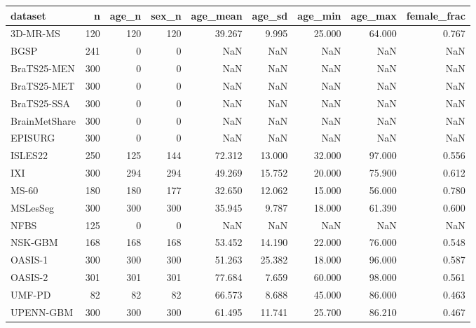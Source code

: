 \begin{tabular}{lrrrrrrrr}
\toprule
dataset & n & age\_n & sex\_n & age\_mean & age\_sd & age\_min & age\_max & female\_frac \\
\midrule
3D-MR-MS & 120 & 120 & 120 & 39.267 & 9.995 & 25.000 & 64.000 & 0.767 \\
BGSP & 241 & 0 & 0 & NaN & NaN & NaN & NaN & NaN \\
BraTS25-MEN & 300 & 0 & 0 & NaN & NaN & NaN & NaN & NaN \\
BraTS25-MET & 300 & 0 & 0 & NaN & NaN & NaN & NaN & NaN \\
BraTS25-SSA & 300 & 0 & 0 & NaN & NaN & NaN & NaN & NaN \\
BrainMetShare & 300 & 0 & 0 & NaN & NaN & NaN & NaN & NaN \\
EPISURG & 300 & 0 & 0 & NaN & NaN & NaN & NaN & NaN \\
ISLES22 & 250 & 125 & 144 & 72.312 & 13.000 & 32.000 & 97.000 & 0.556 \\
IXI & 300 & 294 & 294 & 49.269 & 15.752 & 20.000 & 75.900 & 0.612 \\
MS-60 & 180 & 180 & 177 & 32.650 & 12.062 & 15.000 & 56.000 & 0.780 \\
MSLesSeg & 300 & 300 & 300 & 35.945 & 9.787 & 18.000 & 61.390 & 0.600 \\
NFBS & 125 & 0 & 0 & NaN & NaN & NaN & NaN & NaN \\
NSK-GBM & 168 & 168 & 168 & 53.452 & 14.190 & 22.000 & 76.000 & 0.548 \\
OASIS-1 & 300 & 300 & 300 & 51.263 & 25.382 & 18.000 & 96.000 & 0.587 \\
OASIS-2 & 301 & 301 & 301 & 77.684 & 7.659 & 60.000 & 98.000 & 0.561 \\
UMF-PD & 82 & 82 & 82 & 66.573 & 8.688 & 45.000 & 86.000 & 0.463 \\
UPENN-GBM & 300 & 300 & 300 & 61.495 & 11.741 & 25.700 & 86.210 & 0.467 \\
\bottomrule
\end{tabular}
